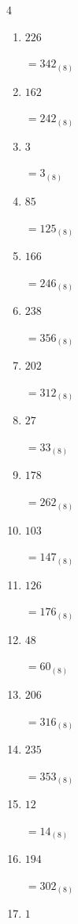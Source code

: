 \begin{multicols}{4}
\begin{enumerate}
  \item $226$

        $=342_{(8)}$

  \item $162$

        $=242_{(8)}$

  \item $3$

        $=3_{(8)}$

  \item $85$

        $=125_{(8)}$

  \item $166$

        $=246_{(8)}$

  \item $238$

        $=356_{(8)}$

  \item $202$

        $=312_{(8)}$

  \item $27$

        $=33_{(8)}$

  \item $178$

        $=262_{(8)}$

  \item $103$

        $=147_{(8)}$

  \item $126$

        $=176_{(8)}$

\columnbreak %

  \item $48$

        $=60_{(8)}$

  \item $206$

        $=316_{(8)}$

  \item $235$

        $=353_{(8)}$

  \item $12$

        $=14_{(8)}$

  \item $194$

        $=302_{(8)}$

  \item $1$


\end{enumerate}
\end{multicols}
